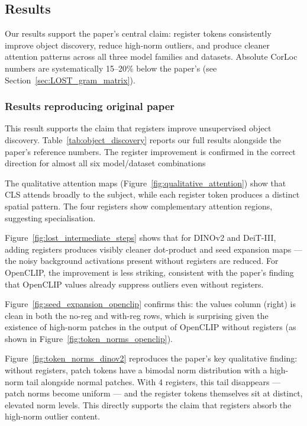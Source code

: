 \subsection{Results}
Our results support the paper's central claim: register tokens consistently improve object discovery,
reduce high-norm outliers, and produce cleaner attention patterns across all three model families and
datasets. Absolute CorLoc numbers are systematically 15--20\% below the paper's (see Section~\ref{sec:LOST_gram_matrix}).
\subsubsection{Results reproducing original paper}
This result supports the claim that registers improve unsupervised object discovery. Table~\ref{tab:object_discovery} reports our full results alongside the paper's reference numbers. The register improvement is confirmed in the correct direction for almost all six model/dataset combinations

The qualitative attention maps (Figure~\ref{fig:qualitative_attention}) show that CLS attends broadly to the subject, while each register token produces a distinct spatial pattern. The four registers show complementary attention regions, suggesting specialisation.

Figure~\ref{fig:lost_intermediate_steps} shows that for DINOv2 and DeiT-III, adding registers produces visibly cleaner dot-product and seed expansion maps — the noisy background activations present without registers are reduced. For OpenCLIP, the improvement is less striking, consistent with the paper's finding that OpenCLIP values already suppress outliers even without registers.

Figure~\ref{fig:seed_expansion_openclip} confirms this: the values column (right) is clean in both the no-reg and with-reg rows, which is surprising given the existence of high-norm patches in the output of OpenCLIP without registers (as shown in Figure~\ref{fig:token_norms_openclip}).

Figure~\ref{fig:token_norms_dinov2} reproduces the paper's key qualitative finding: without registers, patch tokens have a bimodal norm distribution with a high-norm tail alongside normal patches. With 4 registers, this tail disappears — patch norms become uniform — and the register tokens themselves sit at distinct, elevated norm levels. This directly supports the claim that registers absorb the high-norm outlier content.

